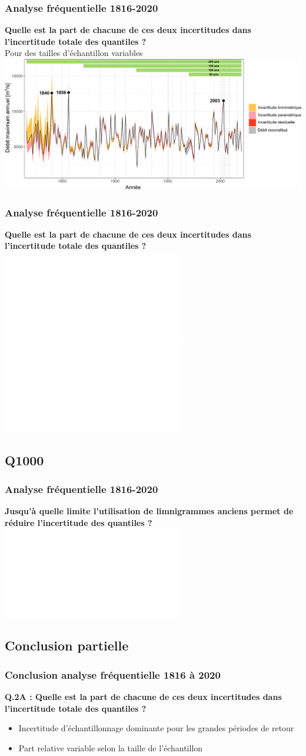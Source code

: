 \documentclass[compress,9pt]{beamer}
\begin{document}
	\begin{frame}[t]
		\frametitle{Analyse fréquentielle 1816-2020}
		\vfill
		\centering
		\textbf{Quelle est la part de chacune de ces deux incertitudes dans l'incertitude totale des quantiles ? }\\
		Pour des tailles d'échantillon variables\\
		\vfill
		\centering
		\includegraphics[width = .9\textwidth]{./Figures/IC_AMAX_Both_Bands.pdf} 
		\vfill
	\end{frame}
	
	\begin{frame}[t]
		\frametitle{Analyse fréquentielle 1816-2020}
		\vfill
		\centering
		\textbf{Quelle est la part de chacune de ces deux incertitudes dans l'incertitude totale des quantiles ? }\\
		\vfill
		\centering
		\includegraphics<1>[width = .8\textwidth]{./Figures/Ukplot4cases1.pdf}	
		\includegraphics<2>[width = .8\textwidth]{./Figures/Ukplot4cases2.pdf}	
		\vfill
	\end{frame}
	
	\subsection{Q1000}
	\begin{frame}[c]
		\frametitle{Analyse fréquentielle 1816-2020}
		\vfill
		\centering
		\textbf{Jusqu'à quelle limite l'utilisation de limnigrammes anciens permet de réduire l'incertitude des quantiles ?}
		\vfill
		\centering
		\includegraphics<1>[width = .78\textwidth]{./Figures/10e-Q1000SSize.pdf}
	\end{frame}
	
	\subsection{Conclusion partielle} 
	\begin{frame}[t]
		\frametitle{Conclusion analyse fréquentielle 1816 à 2020}
		\vfill
		\centering
		\large{\textbf{Q.2A : Quelle est la part de chacune de ces deux incertitudes dans l'incertitude totale des quantiles ?}}
		\vspace{10pt}
		\begin{itemize}
		\normalsize
			\item<2->[$\vartriangleright$] Incertitude d'échantillonnage dominante pour les grandes périodes de retour
			\vspace{5pt}
			\item<3->[$\vartriangleright$] Part relative variable selon la taille de l'échantillon
		\end{itemize}
		\vfill
	\end{frame}
	
\end{document}
